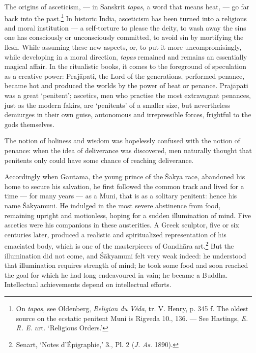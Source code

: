 \documentclass[a4paper, 11pt, oneside, english, landscape]{article}
\begin{document}
The origins of asceticism, --- in Sanskrit \emph{tapas}, a word that means heat, --- go far back into the past.\footnote{On \emph{tapas}, see Oldenberg, \emph{Religion du Véda}, tr. V. Henry, p. 345 f. The oldest source on the ecstatic penitent Muni is Rigveda 10., 136. --- See Hastings, \emph{E. R. E.} art. `Religious Orders.'} In historic India, asceticism has been turned into a religious and moral institution --- a self-torture to please the deity, to wash away the sins one has consciously or unconsciously committed, to avoid sin by mortifying the flesh. While assuming these new aspects, or, to put it more uncompromisingly, while developing in a moral direction, \emph{tapas} remained and remains an essentially magical affair. In the ritualistic books, it comes to the foreground of speculation as a creative power: Prajāpati, the Lord of the generations, performed penance, became hot and produced the worlds by the power of heat or penance. Prajāpati was a great `penitent'; ascetics, men who practise the most extravagant penances, just as the modern fakirs, are `penitents' of a smaller size, but nevertheless demiurges in their own guise, autonomous and irrepressible forces, frightful to the gods themselves.

The notion of holiness and wisdom was hopelessly confused with the notion of penance: when the idea of deliverance was discovered, men naturally thought that penitents only could have some chance of reaching deliverance.

Accordingly when Gautama, the young prince of the Śākya race, abandoned his home to secure his salvation, he first followed the common track and lived for a time --- for many years --- as a Muni, that is as a solitary penitent: hence his name Śākyamuni. He indulged in the most severe abstinence from food, remaining upright and motionless, hoping for a sudden illumination of mind. Five ascetics were his companions in these austerities. A Greek sculptor, five or six centuries later, produced a realistic and spiritualized representation of his emaciated body, which is one of the masterpieces of Gandhāra art.\footnote{Senart, `Notes d'Épigraphie,' 3., Pl. 2 (\emph{J. As.} 1890).} But the illumination did not come, and Śākyamuni felt very weak indeed: he understood that illumination requires strength of mind; he took some food and soon reached the goal for which he had long endeavoured in vain; he became a Buddha. Intellectual achievements depend on intellectual efforts.
\end{document}
